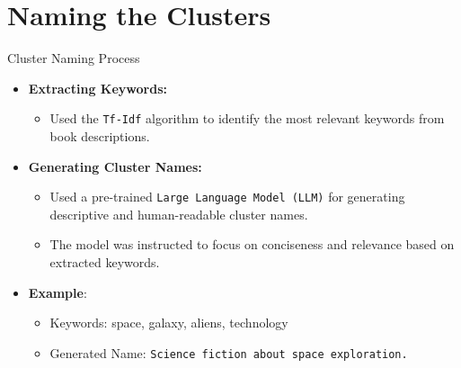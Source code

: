 \documentclass{beamer}
\begin{document}
\section{Naming the Clusters}
\begin{frame}{Cluster Naming Process}
    \begin{itemize}
        \item \textbf{Extracting Keywords:}
            \begin{itemize}
                \item Used the \texttt{Tf-Idf} algorithm to identify the most relevant keywords from book descriptions.
            \end{itemize}
        \item \textbf{Generating Cluster Names:}
            \begin{itemize}
                \item Used a pre-trained \texttt{Large Language Model (LLM)} for generating descriptive and human-readable cluster names.
                \item The model was instructed to focus on conciseness and relevance based on extracted keywords.
            \end{itemize}
        \item \textbf{Example}:
            \begin{itemize}
                \item Keywords: space, galaxy, aliens, technology
                \item Generated Name: \texttt{Science fiction about space exploration.}
            \end{itemize}
    \end{itemize}
\end{frame}
\end{document}
